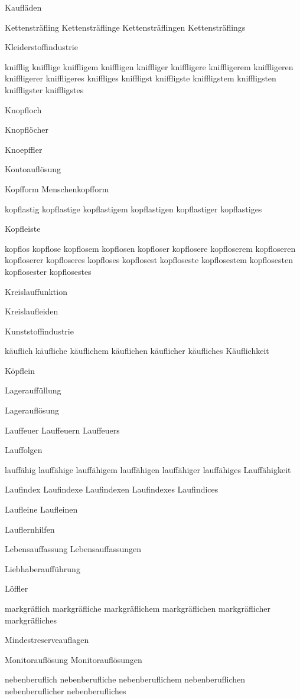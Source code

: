 Kaufläden

Kettensträfling Kettensträflinge Kettensträflingen Kettensträflings

Kleiderstoffindustrie

knifflig knifflige kniffligem kniffligen kniffliger kniffligere kniffligerem kniffligeren kniffligerer kniffligeres kniffliges kniffligst kniffligste kniffligstem kniffligsten kniffligster kniffligstes

Knopfloch

Knopflöcher

Knoepffler

Kontoauflösung

Kopfform Menschenkopfform

kopflastig kopflastige kopflastigem kopflastigen kopflastiger kopflastiges

Kopfleiste

kopflos kopflose kopflosem kopflosen kopfloser kopflosere kopfloserem kopfloseren kopfloserer kopfloseres kopfloses kopflosest kopfloseste kopflosestem kopflosesten kopflosester kopflosestes

Kreislauffunktion

Kreislaufleiden

Kunststoffindustrie

käuflich käufliche käuflichem käuflichen käuflicher käufliches Käuflichkeit

Köpflein

Lagerauffüllung

Lagerauflösung

Lauffeuer Lauffeuern Lauffeuers

Lauffolgen

lauffähig lauffähige lauffähigem lauffähigen lauffähiger lauffähiges Lauffähigkeit

Laufindex Laufindexe Laufindexen Laufindexes Laufindices

Laufleine Laufleinen

Lauflernhilfen

Lebensauffassung Lebensauffassungen

Liebhaberaufführung 

Löffler

markgräflich markgräfliche markgräflichem markgräflichen markgräflicher markgräfliches

Mindestreserveauflagen

Monitorauflösung Monitorauflösungen

nebenberuflich nebenberufliche nebenberuflichem nebenberuflichen nebenberuflicher nebenberufliches

